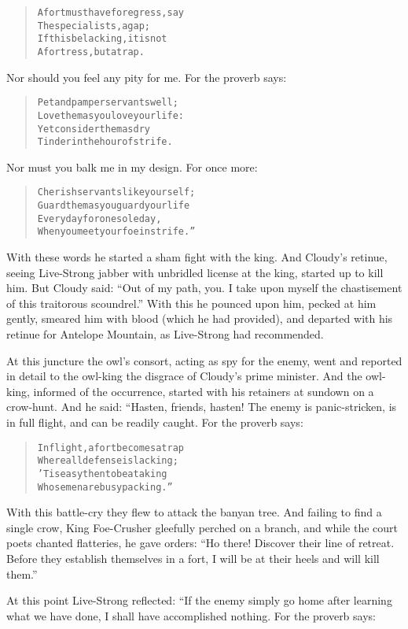 \documentclass[article, twoside, 14pt]{memoir}
\renewenvironment{verbatim}{%
\begin{quote}%
\vskip -10pt%
\begin{alltt}\normalfont\large}{\end{alltt}%
\end{quote}%
\vskip -10pt
} %
\begin{document}
\begin{verbatim}
A fort must have for egress, say
    The specialists, a gap;
If this be lacking, it is not
    A fortress, but a trap.
\end{verbatim}
Nor should you feel any pity for me. For the proverb says:

\begin{verbatim}
Pet and pamper servants well;
    Love them as you love your life:
Yet consider them as dry
    Tinder in the hour of strife.
\end{verbatim}
Nor must you balk me in my design. For once more:

\begin{verbatim}
Cherish servants like yourself;
    Guard them as you guard your life
Every day for one sole day,
    When you meet your foe in strife.”
\end{verbatim}
With these words he started a sham fight with the king. And
Cloudy's retinue, seeing Live-Strong jabber with unbridled license
at the king, started up to kill him. But Cloudy said:
``Out of my path, you. I take upon myself the chastisement of this traitorous scoundrel.''
With this he pounced upon him, pecked at him gently, smeared him
with blood (which he had provided), and departed with his retinue
for Antelope Mountain, as Live-Strong had recommended.

At this juncture the owl's consort, acting as spy for the enemy,
went and reported in detail to the owl-king the disgrace of
Cloudy's prime minister. And the owl-king, informed of the
occurrence, started with his retainers at sundown on a crow-hunt.
And he said: “Hasten, friends, hasten! The enemy is panic-stricken,
is in full flight, and can be readily caught. For the proverb
says:

\begin{verbatim}
In flight, a fort becomes a trap
    Where all defense is lacking;
'Tis easy then to beat a king
    Whose men are busy packing.”
\end{verbatim}
With this battle-cry they flew to attack the banyan tree. And
failing to find a single crow, King Foe-Crusher gleefully perched
on a branch, and while the court poets chanted flatteries, he gave
orders:
``Ho there! Discover their line of retreat. Before they establish themselves in a fort, I will be at their heels and will kill them.''

At this point Live-Strong reflected: “If the enemy simply go home
after learning what we have done, I shall have accomplished
nothing. For the proverb says:
\end{document}
